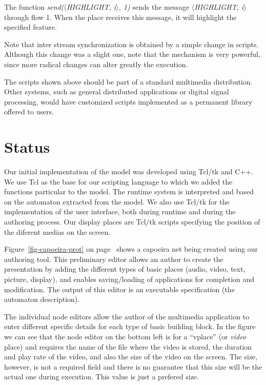 \documentclass[twocolumn,10pt]{article}
\newcommand{\lang}[1]{{\it #1}}
\begin{document}
The function \lang{send($\langle$HIGHLIGHT, i$\rangle$, 1)} sends the
message \lang{$\langle$HIGHLIGHT, i$\rangle$} through flow 1.  When the place
receives this message, it will highlight the specified feature.

Note that inter stream synchronization is obtained by a simple change
in scripts.  Although this change was a slight one,  note that the 
mechanism is very powerful, since
more radical changes can alter greatly the execution.

The
scripts shown above should be part of a standard multimedia
distribution.  Other systems, such as general distributed
applications or digital signal processing, would have customized
scripts implemented as a permanent library offered to users.

\section{Status}
\label{sect-status}

Our initial implementation of the model was developed using Tcl/tk and C++.
We use Tcl as the base for our scripting language to which we added
the functions particular to the model.  The runtime system is
interpreted and based on the automaton extracted from the
model.
We also use Tcl/tk for the implementation of the user interface, both
during runtime and during the authoring process.  Our display places
are Tcl/tk scripts specifying the position of the diferent medias on
the screen.

Figure~\ref{fig-capoeira-prot} on page~\pageref{fig-capoeira-prot} shows a capoeira net being created
using our authoring tool.  This preliminary editor allows an author to
create the presentation by adding the different types of basic places
(audio, video, text, picture, display), and enables saving/loading of
applications for completion and modification.  The output of this
editor is an executable specification (the automaton description).

The individual node editors allow the author of the multimedia
application to enter different specific details for each type of basic
building block.  In the figure we can see that the node editor on the
bottom left is for a ``vplace'' (or {\em video} place) and requires
the name of the file where the video is stored, the duration and play
rate of the video, and also the size of the video on the screen.  The
size, however, is not a required field and there is no guarantee that
this size will be the actual one during execution.  This value is just
a prefered size.
\end{document}
